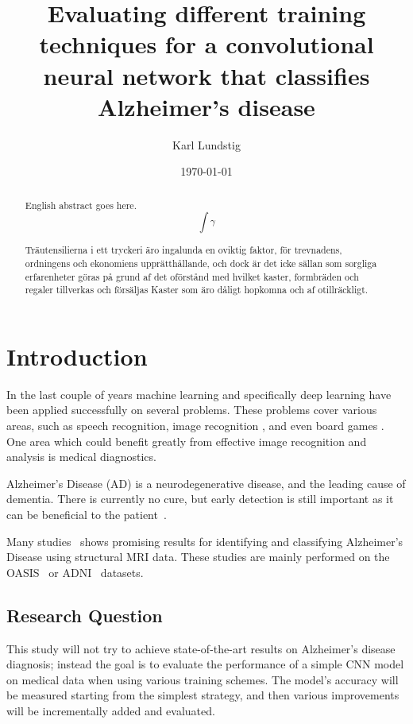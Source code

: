 \documentclass{kththesis}
\title{Evaluating different training techniques for a convolutional neural network that classifies Alzheimer's disease}
\author{Karl Lundstig}
\date{\today}
\begin{document}
\frontmatter

\titlepage

\begin{abstract}
  English abstract goes here.
  $$\int \gamma$$

\end{abstract}


\begin{otherlanguage}{swedish}
  \begin{abstract}
    Träutensilierna i ett tryckeri äro ingalunda en oviktig faktor,
    för trevnadens, ordningens och ekonomiens upprätthållande, och
    dock är det icke sällan som sorgliga erfarenheter göras på grund
    af det oförstånd med hvilket kaster, formbräden och regaler
    tillverkas och försäljas Kaster som äro dåligt hopkomna och af
    otillräckligt.
  \end{abstract}
\end{otherlanguage}


\setcounter{secnumdepth}{2}
\setcounter{tocdepth}{2}
\tableofcontents


\mainmatter

\chapter{Introduction}

In the last couple of years machine learning and specifically deep learning have been applied successfully on several problems. These problems cover various areas, such as speech recognition, image recognition \parencite{krizhevsky2012imagenet}, and even board games \parencite{silver2018general}. One area which could benefit greatly from effective image recognition and analysis is medical diagnostics.

Alzheimer’s Disease (AD) is a neurodegenerative disease, and the leading cause of dementia. There is currently no cure, but early detection is still important as it can be beneficial to the patient~\cite{factsfigures2018}.

Many studies~\cite{islam2017novel, islam2018early} shows promising results for identifying and classifying Alzheimer’s Disease using structural MRI data. These studies are mainly performed on the OASIS~\cite{oasis} or ADNI~\cite{adni} datasets.

\section{Research Question}
This study will not try to achieve state-of-the-art results on Alzheimer's disease diagnosis; instead the goal is to evaluate the performance of a simple CNN model on medical data when using various training schemes. The model's accuracy will be measured starting from the simplest strategy, and then various improvements will be incrementally added and evaluated.
\end{document}
